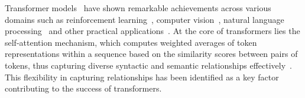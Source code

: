 Transformer models~\cite{vaswani2017attention} have shown remarkable achievements across various domains such as reinforcement learning~\cite{chen2021decision,janner2021offline}, computer vision~\cite{dosovitskiy2021an,touvron2020deit,zhao2021point,guo2021pct}, natural language processing~\cite{devlin2018bert,al2019character,child2019generating,JMLR:v21:20-074} and other practical applications~\cite{zhang2019deep,gulati2020conformer}. At the core of transformers lies the self-attention mechanism, which computes weighted averages of token representations within a sequence based on the similarity scores between pairs of tokens, thus capturing diverse syntactic and semantic relationships effectively~\cite{cho-etal-2014-learning,parikh-etal-2016-decomposable}. This flexibility in capturing relationships has been identified as a key factor contributing to the success of transformers.

\vspace{-2mm}
